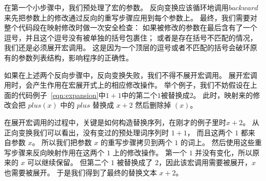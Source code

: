 在第一个小步骤中，我们预处理了宏的参数。
反向变换应该循环地调用$backward$来先把参数上的修改通过反向的重写步骤应用到每个参数上。
最终，我们需要对整个代码段在映射修改时做一次安全检查：
如果被修改的参数在最后含有了一个逗号，并且这个逗号没有被单独的括号包裹住；
或者是存在括号不匹配的情况，我们还是必须展开宏调用。
这是因为一个顶层的逗号或者不匹配的括号会破环原有的参数列表结构，影响程序的正确性。

如果在上述两个反向步骤中，反向变换失败，我们不得不展开宏调用。
展开宏调用时，会产生作用在宏展开式上的相应修改操作。
举个例子，我们不妨假设在上面的代码例子~\ref{eqn:expansion}中$1+1$中的第二个$1$被替换成$2$。
此时，映射来的修改会把 $plus(x)$ 中的 $plus$ 替换成 $x+2$ 然后删除掉 $(x)$。



在展开宏调用的过程中，关键是如何构造替换序列，在刚才的例子里时$x+2$。
从正向变换我们可以看出，没有变过的预处理词序列时 $1+1$， 
而且这两个 $1$ 都来自参数 $x$。
所以我们把参数 $x$ 的重写步骤拷贝到两个 $1$ 的词上。
然后使用这些重写步骤来反向映射作用在这两个 $1$ 上的修改操作。
第一个 $1$ 并没有变化，所以原来的 $x$ 可以继续保留。
但第二个 $1$ 被替换成了 $2$，因此该宏调用需要被展开，$x$ 也需要被展开。
于是我们得到了最终的替换文本 $x+2$。  


